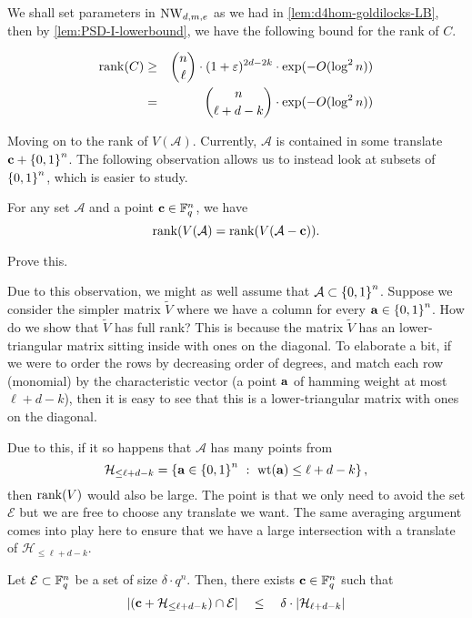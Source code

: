 We shall set parameters in $\operatorname{\mathrm{NW}}_{d,m,e}$ as we had in \autoref{lem:d4hom-goldilocks-LB}, then by \autoref{lem:PSD-I-lowerbound}, we have the following bound for the rank of $C$.

\begin{eqnarray}
\operatorname{rank}(C) & \geq & \binom{n}{\ell} \cdot (1 + \varepsilon)^{2d-2k} \cdot \exp(-O(\log^2 n))\nonumber\\
 & = & \binom{n}{\ell + d - k} \cdot \exp(-O(\log^2 n))\label{eqn:rank-C-lower-bound}
\end{eqnarray}

Moving on to the rank of $V(\mathcal{A})$.
Currently, $\mathcal{A}$ is contained in some translate $\mathbf{c} + \left\{0,1\right\}^n$.
The following observation allows us to instead look at subsets of $\left\{0,1\right\}^n$, which is easier to study.

\begin{observation} For any set $\mathcal{A}$ and a point $\mathbf{c} \in \mathbb{F}_q^n$, we have 
\[
\operatorname{rank}(V(\mathcal{A}) = \operatorname{rank}(V(\mathcal{A} - \mathbf{c})). 
\]
\end{observation}
\begin{exercise}
Prove this. 
\end{exercise}

Due to this observation, we might as well assume that $\mathcal{A} \subset \left\{0,1\right\}^n$.
Suppose we consider the simpler matrix $\tilde{V}$ where we have a column for every $\mathbf{a} \in \left\{0,1\right\}^n$.
How do we show that $\tilde{V}$ has full rank?
This is because the matrix $\tilde{V}$ has an lower-triangular matrix sitting inside with ones on the diagonal.
To elaborate a bit, if we were to order the rows by decreasing order of degrees, and match each row (monomial) by the characteristic vector (a point $\mathbf{a}$ of hamming weight at most $\ell + d - k$), then it is easy to see that this is a lower-triangular matrix with ones on the diagonal.

Due to this, if it so happens that $\mathcal{A}$ has many points from 
\[\mathcal{H}_{\leq \ell+ d - k} = \left\{{\mathbf{a} \in \left\{0,1\right\}^n}\ : \ {\mathrm{wt}(\mathbf{a}) \leq \ell + d - k}\right\},\]
then $\operatorname{rank}(V)$ would also be large.
The point is that we only need to avoid the set $\mathcal{E}$ but we are free to choose any translate we want.
The same averaging argument comes into play here to ensure that we have a large intersection with a translate of $\mathcal{H}_{\leq \ell+ d - k}$.
\begin{lemma}
Let $\mathcal{E} \subset \mathbb{F}_q^n$ be a set of size $\delta \cdot q^n$. Then, there exists $\mathbf{c} \in \mathbb{F}_q^n$ such that 
\[
\left|(\mathbf{c} + \mathcal{H}_{\leq \ell+ d - k}) \cap \mathcal{E}\right| \quad \leq \quad \delta \cdot \left|\mathcal{H}_{\ell + d - k}\right|
\]
\end{lemma}

